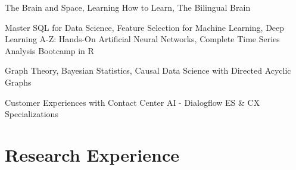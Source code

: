 \documentclass[letterpaper]{deedy-resume} %
\begin{document}
\sectionspace %
\begin{tightitemize}
\item The Brain and Space, Learning How to Learn, The Bilingual Brain
\item Master SQL for Data Science, Feature Selection for Machine Learning, Deep Learning A-Z: Hands-On Artificial Neural Networks, Complete Time Series Analysis Bootcamp in R
\item Graph Theory, Bayesian Statistics, Causal Data Science with Directed Acyclic Graphs
\item Customer Experiences with Contact Center AI - Dialogflow ES \& CX Specializations
\end{tightitemize}
\sectionspace %

\section{Research Experience}
\end{document}
